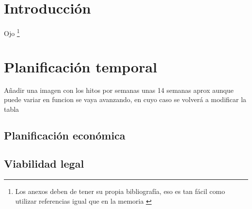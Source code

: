 
\section{Introducción}

Ojo \footnote{Los anexos deben de tener su propia bibliografía, eso es tan fácil como utilizar referencias igual que en la memoria \cite{bortolot2005}}

\section{Planificación temporal}

Añadir una imagen con los hitos por semanas unas 14 semanas aprox aunque puede variar en funcion se vaya avanzando, en cuyo caso se volverá a modificar la tabla

\subsection{Planificación económica}

\subsection{Viabilidad legal}

